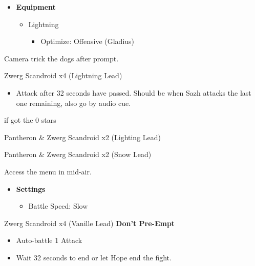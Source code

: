 \begin{paracol}{2}
	\begin{menu}
		\begin{itemize}
			\item \textbf{Equipment}
			      \begin{itemize}
				      \item Lightning
				            \begin{itemize}
					            \item Optimize: Offensive (Gladius)
				            \end{itemize}
			      \end{itemize}
		\end{itemize}
	\end{menu}
\switchcolumn
	Camera trick the dogs after prompt.

	\begin{battle}{Zwerg Scandroid x4 (Lightning Lead)}
		\begin{itemize}
			\item Attack after 32 seconds have passed. Should be when Sazh attacks the last one remaining, also go by audio cue.
		\end{itemize}
		 if got the 0 stars
	\end{battle}


	\begin{battle}{Pantheron \& Zwerg Scandroid x2 (Lighting Lead)}
	\end{battle}

	\switchcolumn*
	\begin{battle}{Pantheron \& Zwerg Scandroid x2 (Snow Lead)}
	\end{battle}
	Access the menu in mid-air.

	\begin{menu}
		\begin{itemize}
			\item \textbf{Settings}
			      \begin{itemize}
				      \item Battle Speed: Slow
			      \end{itemize}
		\end{itemize}
	\end{menu}

	\begin{battle}{Zwerg Scandroid x4 (Vanille Lead) \textbf{Don't Pre-Empt}}
		\begin{itemize}
			\item Auto-battle 1 Attack
			\item Wait 32 seconds to end or let Hope end the fight.
		\end{itemize}
	\end{battle}


\end{paracol}
